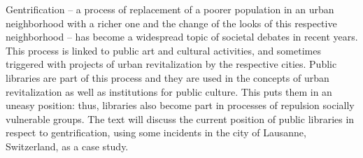 Gentrification -- a process of replacement of a poorer population in an
urban neighborhood with a richer one and the change of the looks of this
respective neighborhood -- has become a widespread topic of societal
debates in recent years. This process is linked to public art and
cultural activities, and sometimes triggered with projects of urban
revitalization by the respective cities. Public libraries are part of
this process and they are used in the concepts of urban revitalization
as well as institutions for public culture. This puts them in an uneasy
position: thus, libraries also become part in processes of repulsion
socially vulnerable groups. The text will discuss the current position
of public libraries in respect to gentrification, using some incidents
in the city of Lausanne, Switzerland, as a case study.
